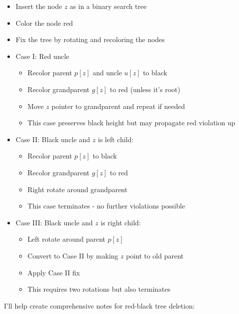 \begin{itemize}
    \item Insert the node \( z \) as in a binary search tree
    \item Color the node red
    \item Fix the tree by rotating and recoloring the nodes
    \item Case I: Red uncle
        \begin{itemize}
            \item Recolor parent \( p[z] \) and uncle \( u[z] \) to black
            \item Recolor grandparent \( g[z] \) to red (unless it's root)
            \item Move \( z \) pointer to grandparent and repeat if needed
            \item This case preserves black height but may propagate red violation up
        \end{itemize}
    \item Case II: Black uncle and \( z \) is left child:
        \begin{itemize}
            \item Recolor parent \( p[z] \) to black
            \item Recolor grandparent \( g[z] \) to red
            \item Right rotate around grandparent
            \item This case terminates - no further violations possible
        \end{itemize}
    \item Case III: Black uncle and \( z \) is right child:
        \begin{itemize}
            \item Left rotate around parent \( p[z] \)
            \item Convert to Case II by making \( z \) point to old parent
            \item Apply Case II fix
            \item This requires two rotations but also terminates
        \end{itemize}
\end{itemize}

I'll help create comprehensive notes for red-black tree deletion:

